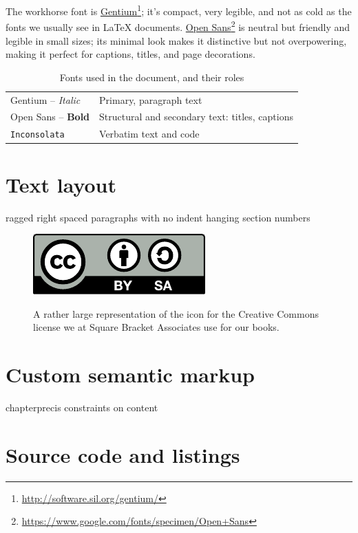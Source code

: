\documentclass[english,twoside,openany,showtrims]{sbabook}
\newcommand\hrefnote[2]{%
  \href{#1}{#2}\footnote{\url{#1}}}
\begin{document}
The workhorse font is \hrefnote{http://software.sil.org/gentium/}{Gentium}; it's
compact, very legible, and not as cold as the fonts we usually see in \LaTeX{}
documents.
\hrefnote{https://www.google.com/fonts/specimen/Open+Sans}{Open Sans} is neutral
but friendly and legible in small sizes; its minimal look makes it distinctive
but not overpowering, making it perfect for captions, titles, and page
decorations.

\begin{table}[htb]
  \caption{Fonts used in the document, and their roles}
  \begin{tabular}{ll}
    \toprule
    \textnormal{Gentium -- \textit{Italic}} & Primary, paragraph text \\
    \textsf{Open Sans -- \textbf{Bold}}     & Structural and secondary text: titles, captions \\
    \texttt{Inconsolata}                    & Verbatim text and code \\
    \bottomrule
  \end{tabular}
  \label{tab:fontRoles}
\end{table}


\section{Text layout}

ragged right
spaced paragraphs with no indent
hanging section numbers

\begin{figure}[tb]
  \caption{A rather large representation of the icon for the Creative Commons
    license we at Square Bracket Associates use for our books.}
  \includegraphics{CreativeCommons-BY-SA}
  \label{fig:cc-by-sa-icon}
\end{figure}

\section{Custom semantic markup}

chapterprecis
constraints on content


\section{Source code and listings}
\end{document}
